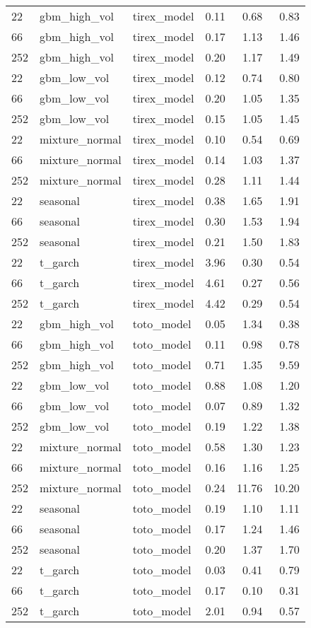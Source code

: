 {\begin{tabular}{lllrrr}
\midrule
22 & gbm\_high\_vol & tirex\_model & 0.11 & 0.68 & 0.83 \\
66 & gbm\_high\_vol & tirex\_model & 0.17 & 1.13 & 1.46 \\
252 & gbm\_high\_vol & tirex\_model & 0.20 & 1.17 & 1.49 \\
\midrule
22 & gbm\_low\_vol & tirex\_model & 0.12 & 0.74 & 0.80 \\
66 & gbm\_low\_vol & tirex\_model & 0.20 & 1.05 & 1.35 \\
252 & gbm\_low\_vol & tirex\_model & 0.15 & 1.05 & 1.45 \\
\midrule
22 & mixture\_normal & tirex\_model & 0.10 & 0.54 & 0.69 \\
66 & mixture\_normal & tirex\_model & 0.14 & 1.03 & 1.37 \\
252 & mixture\_normal & tirex\_model & 0.28 & 1.11 & 1.44 \\
\midrule
22 & seasonal & tirex\_model & 0.38 & 1.65 & 1.91 \\
66 & seasonal & tirex\_model & 0.30 & 1.53 & 1.94 \\
252 & seasonal & tirex\_model & 0.21 & 1.50 & 1.83 \\
\midrule
22 & t\_garch & tirex\_model & 3.96 & 0.30 & 0.54 \\
66 & t\_garch & tirex\_model & 4.61 & 0.27 & 0.56 \\
252 & t\_garch & tirex\_model & 4.42 & 0.29 & 0.54 \\
\midrule
22 & gbm\_high\_vol & toto\_model & 0.05 & 1.34 & 0.38 \\
66 & gbm\_high\_vol & toto\_model & 0.11 & 0.98 & 0.78 \\
252 & gbm\_high\_vol & toto\_model & 0.71 & 1.35 & 9.59 \\
\midrule
22 & gbm\_low\_vol & toto\_model & 0.88 & 1.08 & 1.20 \\
66 & gbm\_low\_vol & toto\_model & 0.07 & 0.89 & 1.32 \\
252 & gbm\_low\_vol & toto\_model & 0.19 & 1.22 & 1.38 \\
\midrule
22 & mixture\_normal & toto\_model & 0.58 & 1.30 & 1.23 \\
66 & mixture\_normal & toto\_model & 0.16 & 1.16 & 1.25 \\
252 & mixture\_normal & toto\_model & 0.24 & 11.76 & 10.20 \\
\midrule
22 & seasonal & toto\_model & 0.19 & 1.10 & 1.11 \\
66 & seasonal & toto\_model & 0.17 & 1.24 & 1.46 \\
252 & seasonal & toto\_model & 0.20 & 1.37 & 1.70 \\
\midrule
22 & t\_garch & toto\_model & 0.03 & 0.41 & 0.79 \\
66 & t\_garch & toto\_model & 0.17 & 0.10 & 0.31 \\
252 & t\_garch & toto\_model & 2.01 & 0.94 & 0.57 \\
\bottomrule
\end{tabular}
}